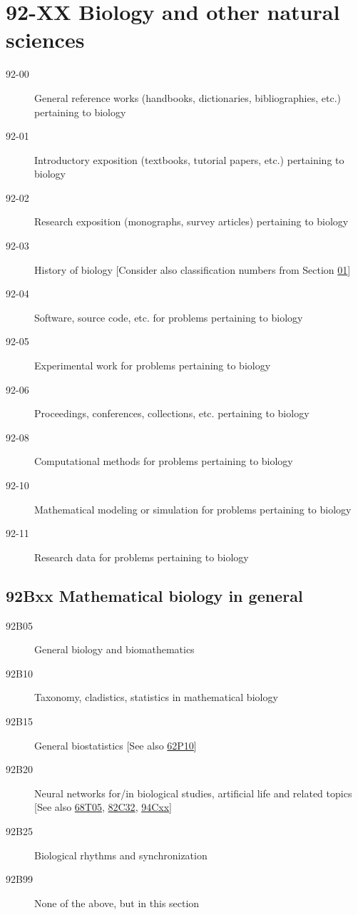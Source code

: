 \section*{92-XX Biology and other natural sciences }\label{92-XX}
\begin{description}
\item [92-00]\label{92-00} General reference works (handbooks, dictionaries, bibliographies, etc.) pertaining to biology
\item [92-01]\label{92-01} Introductory exposition (textbooks, tutorial papers, etc.) pertaining to biology
\item [92-02]\label{92-02} Research exposition (monographs, survey articles) pertaining to biology
\item [92-03]\label{92-03} History of biology [Consider also classification numbers from Section \hyperref[01-XX]{01}]
\item [92-04]\label{92-04} Software, source code, etc. for problems pertaining to biology
\item [92-05]\label{92-05} Experimental work for problems pertaining to biology
\item [92-06]\label{92-06} Proceedings, conferences, collections, etc. pertaining to biology
\item [92-08]\label{92-08} Computational methods for problems pertaining to biology
\item [92-10]\label{92-10} Mathematical modeling or simulation for problems pertaining to biology
\item [92-11]\label{92-11} Research data for problems pertaining to biology
\end{description}
\subsection*{92Bxx  Mathematical biology in general }\label{92Bxx}
\begin{description}  
\item [92B05]\label{92B05} General biology and biomathematics
\item [92B10]\label{92B10} Taxonomy, cladistics, statistics in mathematical biology
\item [92B15]\label{92B15} General biostatistics [See also \hyperref[62P10]{62P10}]
\item [92B20]\label{92B20} Neural networks for/in biological studies, artificial life and related topics [See also \hyperref[68T05]{68T05}, \hyperref[82C32]{82C32}, \hyperref[94Cxx]{94Cxx}]
\item [92B25]\label{92B25} Biological rhythms and synchronization
\item [92B99]\label{92B99} None of the above, but in this section
\end{description}
